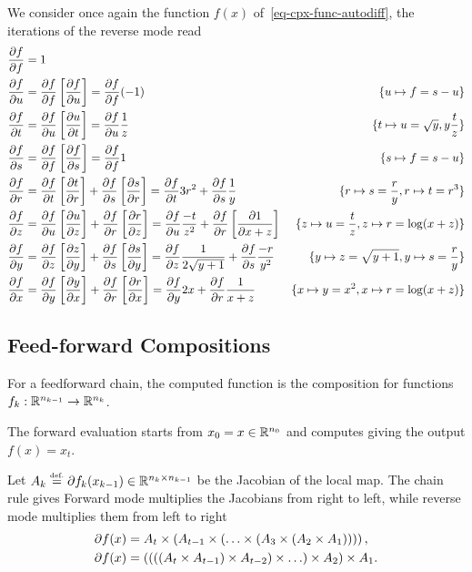 We consider once again the function $f(x)$ of~\eqref{eq-cpx-func-autodiff}, the iterations of the reverse mode read
\begin{align*}
		\pd{f}{f} &= 1 &\\
		\pd{f}{u} &= \pd{f}{f} \pdb{f}{u} 
			= \pd{f}{f} (-1) &
			\{u \mapsto f = s-u\}\\
		\pd{f}{t} &= \pd{f}{u} \pdb{u}{t} 
			= \pd{f}{u} \frac{1}{z}  & 
			\{ t \mapsto u= \sqrt{y}, y \frac{t}{z} \} \\
		\pd{f}{s} &= \pd{f}{f} \pdb{f}{s} = \pd{f}{f} 1 & 
			\{ s \mapsto f = s-u \} \\
		\pd{f}{r} &= \pd{f}{t} \pdb{t}{r} + \pd{f}{s} \pdb{s}{r} 
			= \pd{f}{t} 3r^2 + \pd{f}{s} \frac{1}{y} & 
			\{ r \mapsto s = \frac{r}{y}, r \mapsto  t=r^3\}  \\
		\pd{f}{z} &= \pd{f}{u} \pdb{u}{z} + \pd{f}{r} \pdb{r}{z} 
			= \pd{f}{u} \frac{-t}{z^2} + \pd{f}{r} \pdb{1}{x+z} &
			\{ z \mapsto u=\frac{t}{z}, z \mapsto r=\log(x+z)\} \\
		\pd{f}{y} &= \pd{f}{z}\pdb{z}{y} + \pd{f}{s}\pdb{s}{y}
			= \pd{f}{z} \frac{1}{2\sqrt{y+1}} + \pd{f}{s}\frac{-r}{y^2} &
			\{ y \mapsto z=\sqrt{y+1}, y \mapsto s = \frac{r}{y}\} \\
		\pd{f}{x} &= \pd{f}{y}\pdb{y}{x} + \pd{f}{r}\pdb{r}{x}
			= \pd{f}{y} 2x + \pd{f}{r} \frac{1}{x+z}  &
			\{x \mapsto y=x^2, x \mapsto r=\log(x+z)\}		
\end{align*}
\fi


\subsection{Feed-forward Compositions}\label{sec-reversemode-simple}

For a feedforward chain, the computed function is the composition
for functions $f_k : \RR^{n_{k-1}} \rightarrow \RR^{n_{k}}$.

The forward evaluation starts from $x_0=x \in \RR^{n_0}$ and computes
giving the output $f(x) = x_t$.

Let $A_k \eqdef \partial f_k(x_{k-1}) \in \RR^{n_{k} \times n_{k-1}}$ be the Jacobian of the local map. The chain rule gives
Forward mode multiplies the Jacobians from right to left, while reverse mode multiplies them from left to right
\begin{align*}
	\partial f(x) &= A_{t} \times \pa{  A_{t-1} \times \pa{ \ldots \times \pa{ A_3 \times \pa{ A_2 \times A_1 } } } }, \\
	\partial f(x) &= \pa{ \pa{ \pa{ \pa{ A_{t} \times A_{t-1} }  \times A_{t-2} } \times \ldots } \times A_2 } \times A_1.
\end{align*}


